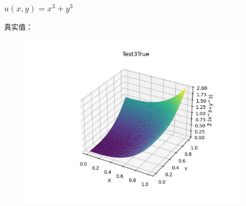 \documentclass{article}
\begin{document}
\subsubsection{$u(x,y)=x^3+y^3$}
真实值：
\begin{figure}[h]
    \centering
    \includegraphics[width=0.7\linewidth]{Test3True.jpg}
\end{figure}
\end{document}
